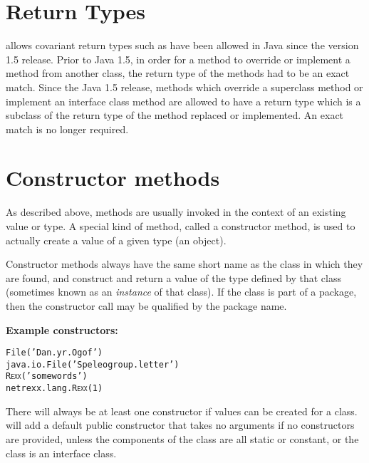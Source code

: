 \section{Return Types}
\nr{} allows covariant return types such as have been allowed in Java since the version 1.5 release. Prior to Java 1.5, in order for a method to override or implement a method from another class, the return type of the methods had to be an exact match. Since the Java 1.5 release, methods which override a superclass method or implement an interface class method are allowed to have a return type which is a subclass of the return type of the method replaced or implemented. An exact match is no longer required.
\section{Constructor methods}\label{refcons}
\index{,}
 
As described above, methods are usually invoked in the context of an
existing value or type.
A special kind of method, called a constructor method, is used to
actually create a value of a given type (an object).
 
Constructor methods always have the same short name as the class in
which they are found, and construct and return a value of the type
defined by that class (sometimes known as an \emph{instance} of that
class).
If the class is part of a package, then the constructor call may be
qualified by the package name.
 
\textbf{Example constructors:}
\begin{alltt}
File('Dan.yr.Ogof')
java.io.File('Speleogroup.letter')
R\textsc{exx}('some words')
netrexx.lang.R\textsc{exx}(1)
\end{alltt}
 
There will always be at least one constructor if values can be created
for a class.  \nr{} will add a default public constructor that takes
no arguments if no constructors are provided, unless the components of
the class are all static or constant, or the class is an interface
class.
 
